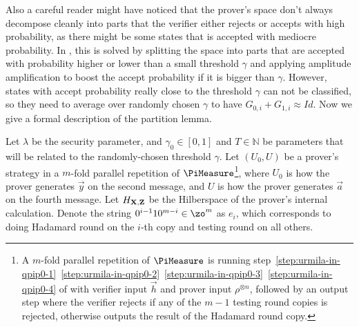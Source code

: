 Also a careful reader might have noticed that the prover's space don't always decompose cleanly into parts that the verifier either rejects or accepts with high probability, as there might be some states that is accepted with mediocre probability. In \cite{arXiv:ChiaChungYam19}, this is solved by splitting the space into parts that are accepted with probability higher or lower than a small threshold $\gamma$ and applying amplitude amplification to boost the accept probability if it is bigger than $\gamma$. However, states with accept probability really close to the threshold $\gamma$ can not be classified, so they need to average over randomly chosen $\gamma$ to have $G_{0,i}+G_{1,i} \approx Id$.
Now we give a formal description of the partition lemma.

\begin{lemma}\label{lem:partition2}
	Let $\lambda$ be the security parameter, and $\gamma_0 \in[0,1]$ and $T\in \mathbb{N}$ be parameters that will be related to the randomly-chosen threshold $\gamma$.
	Let $(U_0,U)$ be a prover's strategy in a $m$-fold parallel repetition of $\PiMeasure$\footnote{A $m$-fold parallel repetition of $\PiMeasure$ is running step~\ref{step:urmila-in-qpip0-1}~\ref{step:urmila-in-qpip0-2}~\ref{step:urmila-in-qpip0-3}~\ref{step:urmila-in-qpip0-4} of  with verifier input $\vec{h}$ and prover input $\rho^{\otimes n}$, followed by an output step where the verifier rejects if any of the $m-1$ testing round copies is rejected, otherwise outputs the result of the Hadamard round copy.}, where $U_0$ is how the prover generates $\vec{y}$ on the second message, and $U$ is how the prover generates $\vec{a}$ on the fourth message. Let $H_{\mathbf{X},\mathbf{Z}}$ be the Hilberspace of the prover's internal calculation.
	Denote the string $0^{i-1}10^{m-i} \in \zo^m $ as $e_i$, which corresponds to doing Hadamard round on the $i$-th copy and testing round on all others.


\end{lemma}
